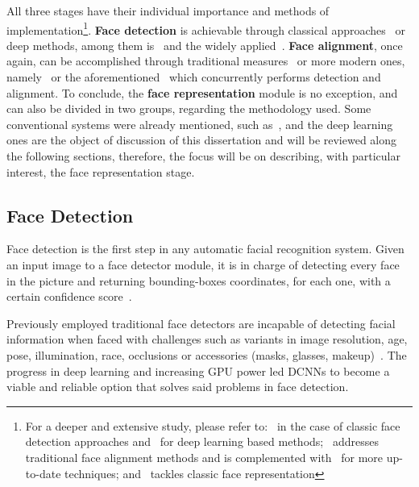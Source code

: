 \documentclass[class=report, crop=false, a4paper, 12pt]{standalone}
\begin{document}
\par All three stages have their individual importance and methods of implementation\footnote{For a deeper and extensive study, please refer to:~\autocite{zafeiriouSurveyFaceDetection2015} in the case of classic face detection approaches and~\autocite{minaeeGoingDeeperFace2021} for deep learning based methods;~\autocite{wangFacialFeaturePoint2018} addresses traditional face alignment methods and is complemented with~\autocite{duElementsEndtoendDeep2022} for more up-to-date techniques; and~\autocite{learned-millerLabeledFacesWild2016} tackles classic face representation }. \textbf{Face detection} is achievable through classical approaches~\autocite{violaRapidObjectDetection2001, brubakerDesignCascadesBoosted2008} or deep methods, among them is~\autocite{dengRetinaFaceSinglestageDense2019} and the widely applied~\autocite{zhangJointFaceDetection2016a}. \textbf{Face alignment}, once again, can be accomplished through traditional measures~\autocite{cootesViewbasedActiveAppearance2002, martinezLocalEvidenceAggregation2013} or more modern ones, namely~\autocite{huangPropagationNetPropagatePoints2020} or the aforementioned~\autocite{zhangJointFaceDetection2016a} which concurrently performs detection and alignment. To conclude, the \textbf{face representation} module is no exception, and can also be divided in two groups, regarding the methodology used. Some conventional systems were already mentioned, such as~\autocite{p.n.belhumeurEigenfacesVsFisherfaces1997,turkEigenfacesRecognition1991}, and the deep learning ones are the object of discussion of this dissertation and will be reviewed along the following sections, therefore, the focus will be on describing, with particular interest, the face representation stage.

\subsection{Face Detection}
\par Face detection is the first step in any automatic facial recognition system. Given an input image to a face detector module, it is in charge of detecting every face in the picture and returning bounding-boxes coordinates, for each one, with a certain confidence score~\autocite{duElementsEndtoendDeep2022,ranjanDeepLearningUnderstanding2018}.

\par Previously employed traditional face detectors  are incapable of detecting facial information when faced with challenges such as variants in image resolution, age, pose, illumination, race, occlusions or accessories (masks, glasses, makeup)~\autocite{duElementsEndtoendDeep2022,ranjanDeepLearningUnderstanding2018}. The progress in deep learning and increasing GPU power led DCNNs to become a viable and reliable option that solves said problems in face detection. 
\end{document}
